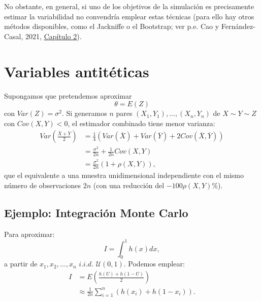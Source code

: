 \documentclass[
]{book}
\theoremstyle{break}
\theoremstyle{definition}
\theoremstyle{definition}
\theoremstyle{definition}
\theoremstyle{definition}
\theoremstyle{remark}
\begin{document}
No obstante, en general, si uno de los objetivos de la simulación es precisamente estimar la variabilidad no convendría emplear estas técnicas
(para ello hay otros métodos disponibles, como el Jackniffe o el Bootstrap; ver p.e. Cao y Fernández-Casal, 2021, \href{https://rubenfcasal.github.io/book_remuestreo/prec-sesgo.html}{Capítulo 2}).

\hypertarget{variables-antituxe9ticas}{%
\section{Variables antitéticas}\label{variables-antituxe9ticas}}

Supongamos que pretendemos aproximar
\[\theta=E\left(  Z\right)\]
con \(Var\left( Z \right) = \sigma^{2}\).
Si generamos \(n\) pares
\(\left( X_{1},Y_{1}\right), ... ,\left( X_{n},Y_{n}\right)\)
de \(X\sim Y\sim Z\) con \(Cov\left( X,Y\right) < 0\),
el estimador combinado tiene menor varianza:
\[\begin{aligned}
    Var\left(  \frac{\overline{X}+\overline{Y}}{2}\right)   & =\frac{1}{4}\left(
    Var\left(  \overline{X}\right)  +Var\left(  \overline{Y}\right)  +2Cov\left(
    \overline{X},\overline{Y}\right)  \right) \\
    & =\frac{\sigma^{2}}{2n}+\frac{1}{2n}Cov\left(  X,Y\right) \\
    & =\frac{\sigma^{2}}{2n}\left(  1+\rho \left(  X,Y\right)  \right),
\end{aligned}\]
que el equivalente a una muestra unidimensional independiente con el
mismo número de observaciones \(2n\) (con una reducción del
\(-100\rho \left( X,Y\right) \%\)).

\hypertarget{ejemplo-integraciuxf3n-monte-carlo}{%
\subsection{Ejemplo: Integración Monte Carlo}\label{ejemplo-integraciuxf3n-monte-carlo}}

Para aproximar:
\[I=\int_{0}^{1}h\left(  x\right) dx,\]
a partir de \(x_{1},x_{2},\ldots,x_{n}\) \(i.i.d.\)
\(\mathcal{U}\left(0,1\right)\).
Podemos emplear:
\[\begin{aligned}
    I  & =E\left(  \frac{h\left(  U\right)  +h\left(  1-U\right)  }{2}\right) \\
    & \approx \frac{1}{2n}\sum \limits_{i=1}^{n}\left(  h\left(  x_{i}\right)
    +h\left(  1-x_{i}\right)  \right).
\end{aligned}\]
\end{document}
